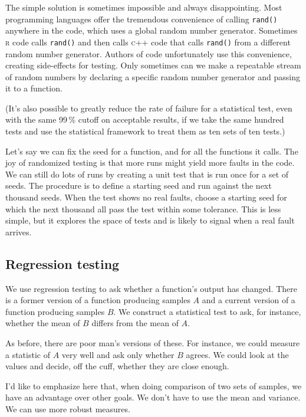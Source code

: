 \documentclass[fleqn,10pt]{olplainarticle}
\newcommand{\rlang}{\textsc{r}\xspace}
\newcommand{\cpp}{\textsc{c}++\xspace}
\begin{document}
The simple solution is sometimes impossible and always
disappointing. Most programming languages offer the tremendous
convenience of calling \lstinline!rand()! anywhere in the
code, which uses a global random number generator. Sometimes
\rlang code calls \lstinline!rand()! and then calls \cpp code
that calls \lstinline!rand()! from a different random number
generator. Authors
of code unfortunately use this convenience, creating side-effects
for testing. Only sometimes can we make a repeatable
stream of random numbers by declaring a specific random number generator
and passing it to a function.

(It's also possible to greatly reduce the rate of failure
for a statistical test, even with the same 99\,\% cutoff
on acceptable results, if we take the same hundred tests
and use the statistical framework to treat them as ten sets
of ten tests.)

Let's say we can fix the seed for a function, and for all the
functions it calls. The joy of randomized testing is that more
runs might yield more faults in the code. We
can still do lots of runs by creating a unit test that is run once
for a set of seeds.  The procedure is to define a starting seed and run against
the next thousand seeds. When the test shows no real faults,
choose a starting seed for which the next thousand all pass
the test within some tolerance. This is less simple, but it
explores the space of tests and is likely to signal when
a real fault arrives.


\subsection{Regression testing}

We use regression testing to ask whether a function's output has changed.
There is a former version of a function producing samples $A$ and a current
version of a function producing samples $B$. We construct a statistical
test to ask, for instance, whether the mean of $B$ differs from the mean of $A$.

As before, there are poor man's versions of these. For instance, we could
measure a statistic of $A$ very well and ask only whether $B$ agrees.
We could look at the values and decide, off the cuff, whether they are close
enough.

I'd like to emphasize here that, when doing comparison of two sets of samples,
we have an advantage over other goals. We don't have to use the mean and
variance. We can use more robust measures.
\end{document}
